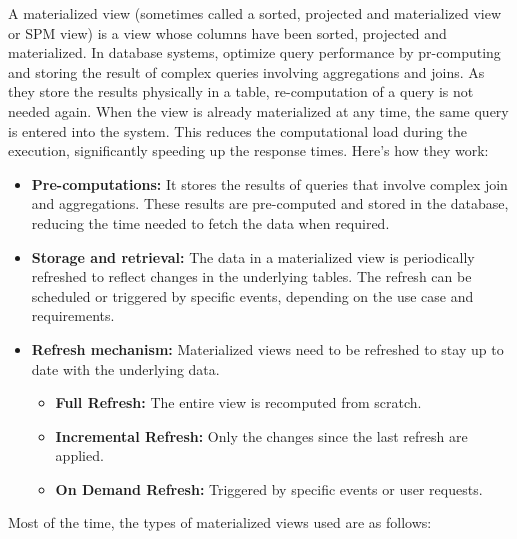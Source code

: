 A materialized view (sometimes called a sorted, projected and materialized view or SPM view) is a view whose columns have been sorted, projected and materialized.\cite{IBM} In database systems, optimize query performance by pr-computing and storing the result of complex queries involving aggregations and joins. As they store the results physically in a table, re-computation of a query is not needed again. When the view is already materialized at any time, the same query is entered into the system. This reduces the computational load during the execution, significantly speeding up the response times. Here's how they work:\vspace{.4cm}


\begin{itemize}
    \item\textbf{Pre-computations:} It stores the results of queries that involve complex join and aggregations. These results are pre-computed and stored in the database, reducing the time needed to fetch the data when required.
    \item\textbf{Storage and retrieval:} The data in a materialized view is periodically refreshed to reflect changes in the underlying tables. The refresh can be scheduled or triggered by specific events, depending on the use case and requirements.
    \item\textbf{Refresh mechanism:}  Materialized views need to be refreshed to stay up to date with the underlying data.\vspace{.4cm}

    \begin{itemize}
        \item\textbf{Full Refresh:} The entire view is recomputed from scratch.
        \item\textbf{Incremental Refresh:} Only the changes since the last refresh are applied.
        \item\textbf{On Demand Refresh:} Triggered by specific events or user requests.
    \end{itemize}
\end{itemize}\vspace{.4cm}

Most of the time, the types of materialized views used are as follows:\vspace{.4cm}

